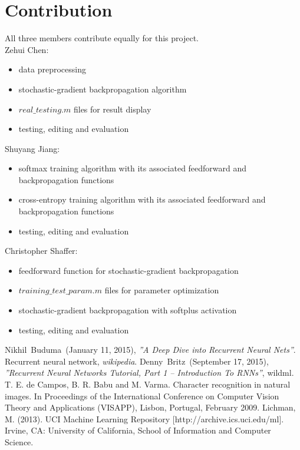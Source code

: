 \documentclass[journal,a4paper,onecolumn,11pt]{IEEEtran}
\begin{document}
\section{Contribution}
All three members contribute equally for this project. \\
Zehui Chen:
\begin{itemize}
	\item data preprocessing 
	\item stochastic-gradient backpropagation algorithm 
	\item $real\_testing.m$ files for result display
	\item testing, editing and evaluation  
\end{itemize}
Shuyang Jiang:
\begin{itemize}
	\item softmax training algorithm with its associated feedforward and backpropagation functions 
	\item cross-entropy training algorithm with its associated feedforward and backpropagation functions 
	\item testing, editing and evaluation
\end{itemize}
Christopher Shaffer:
\begin{itemize}
	\item feedforward function for stochastic-gradient backpropagation 
	\item $training\_test\_param.m$ files for parameter optimization
	\item stochastic-gradient backpropagation with softplus activation 
	\item testing, editing and evaluation 
\end{itemize}



\begin{thebibliography}{1}
	
	Nikhil~Buduma~(January 11, 2015), \emph{''A Deep Dive into Recurrent Neural Nets''}.
	Recurrent neural network, \emph{wikipedia}.
	Denny~Britz~(September 17, 2015), \emph{''Recurrent Neural Networks Tutorial, Part 1 -- Introduction To RNNs''}, wildml.
	T. E. de Campos, B. R. Babu and M. Varma. Character recognition in natural images. In Proceedings of the International Conference on Computer Vision Theory and Applications (VISAPP), Lisbon, Portugal, February 2009.
	Lichman, M. (2013). UCI Machine Learning Repository [http://archive.ics.uci.edu/ml]. Irvine, CA: University of California, School of Information and Computer Science.
	
	
\end{thebibliography}
\end{document}
